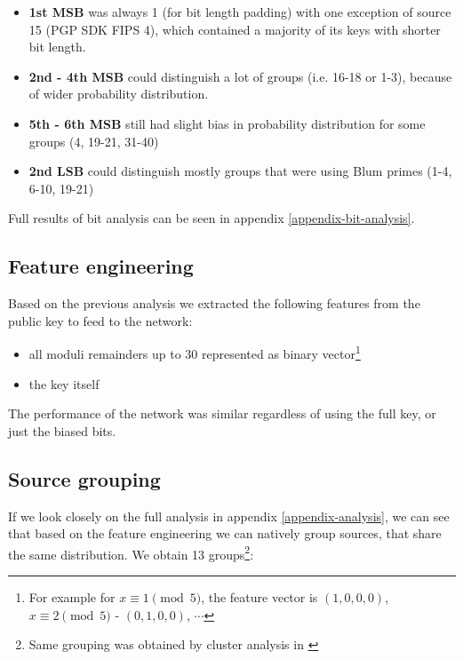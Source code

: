 \begin{itemize}

\item \textbf{1st MSB} was always 1 (for bit length padding) with one exception of source 15 (PGP SDK FIPS 4), which contained a majority of its keys with shorter bit length.

\item \textbf{2nd - 4th MSB} could distinguish a lot of groups (i.e. 16-18 or 1-3), because of wider probability distribution.

\item \textbf{5th - 6th MSB} still had slight bias in probability distribution for some groups (4, 19-21, 31-40)

\item \textbf{2nd LSB} could distinguish mostly groups that were using Blum primes (1-4, 6-10, 19-21)

\end{itemize}

\noindent
Full results of bit analysis can be seen in appendix \ref{appendix-bit-analysis}.

\subsection{Feature engineering}

\label{feature-engineering}

Based on the previous analysis we extracted the following features from the public key to feed to the network:

\begin{itemize}

\item all moduli remainders up to 30 represented as binary vector\footnote{For example for $x \equiv 1 \pmod{5}$, the feature vector is $(1,0,0,0)$, $x \equiv 2 \pmod{5}$ - $(0,1,0,0)$, $\cdots$}

\item the key itself

\end{itemize}

\noindent
The performance of the network was similar regardless of using the full key, or just the biased bits.

\subsection{Source grouping}
If we look closely on the full analysis in appendix \ref{appendix-analysis}, we can see that based on the feature engineering we can natively group sources, that share the same distribution. We obtain 13 groups\footnote{Same grouping was obtained by cluster analysis in \cite{svenda_1}}:

